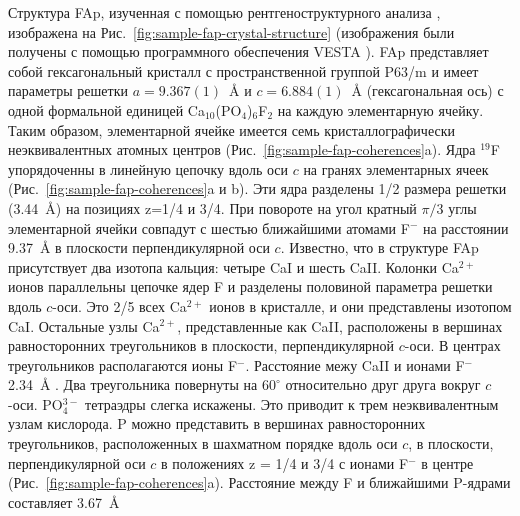 Структура FAp, изученная с помощью рентгеноструктурного анализа \cite{Elliott1994}, изображена на Рис.~\ref{fig:sample-fap-crystal-structure} (изображения были получены с помощью программного обеспечения VESTA \cite{vesta}).
FAp представляет собой гексагональный кристалл с пространственной группой P63/m
и имеет параметры решетки $a=9.367(1)$~\r{A} и $c=6.884(1)$~\r{A}
(гексагональная ось) с одной формальной единицей Ca$_{10}$(PO$_4$)$_6$F$_2$ на каждую элементарную ячейку.
Таким образом, элементарной ячейке имеется семь кристаллографически неэквивалентных атомных центров (Рис.~\ref{fig:sample-fap-coherences}a).
Ядра $^{19}$F упорядоченны в линейную цепочку вдоль оси $c$ на гранях элементарных ячеек (Рис.~\ref{fig:sample-fap-coherences}a и b). Эти ядра разделены 1/2 размера решетки (3.44~\r{A}) на позициях z=1/4 и 3/4. При повороте на угол кратный $\pi/3$ углы элементарной ячейки совпадут с шестью ближайшими атомами F$^-$ на расстоянии 9.37~\r{A}   в плоскости перпендикулярной оси $c$. Известно, что в структуре FAp присутствует два изотопа кальция: четыре CaI и шесть CaII. Колонки Ca$^{2+}$ ионов параллельны цепочке ядер F и разделены половиной параметра решетки вдоль $c$-оси. Это 2/5 всех Ca$^{2+}$ ионов в кристалле, и они представлены изотопом CaI. Остальные узлы Ca$^{2+}$, представленные как CaII, расположены в вершинах равносторонних треугольников в плоскости, перпендикулярной $c$-оси. В центрах треугольников располагаются ионы F$^-$. Расстояние межу CaII и ионами F$^-$ 2.34~\r{A}  . Два треугольника повернуты на $60^\circ$ относительно друг друга вокруг $c$-оси. PO$_4^{3-}$ тетраэдры слегка искажены. Это приводит к трем неэквивалентным узлам кислорода. P можно представить в вершинах равносторонних треугольников, расположенных в шахматном порядке вдоль оси $c$, в плоскости, перпендикулярной оси $c$ в положениях z = 1/4 и 3/4 с ионами F$^-$ в центре (Рис.~\ref{fig:sample-fap-coherences}a). Расстояние между F и ближайшими P-ядрами составляет 3.67~\r{A}

